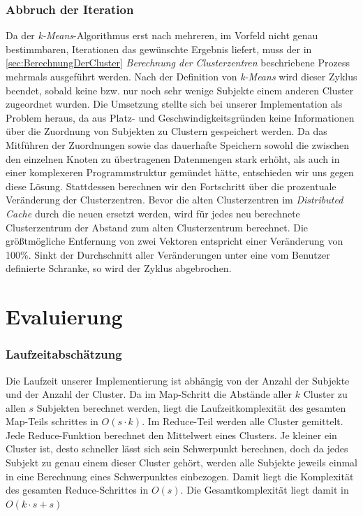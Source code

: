 \documentclass[a4paper]{llncs}
\begin{document}
\subsubsection{Abbruch der Iteration}
Da der \emph{k-Means}-Algorithmus erst nach mehreren, im Vorfeld nicht genau bestimmbaren, Iterationen das gewünschte Ergebnis liefert,
muss der in \ref{sec:BerechnungDerCluster} \emph{Berechnung der Clusterzentren} beschriebene Prozess mehrmals ausgeführt werden.
Nach der Definition von \emph{k-Means} wird dieser Zyklus beendet, sobald keine bzw. nur noch sehr wenige Subjekte einem anderen Cluster zugeordnet wurden.
Die Umsetzung stellte sich bei unserer Implementation als Problem heraus, da aus Platz- und Geschwindigkeitsgründen keine Informationen über die Zuordnung von Subjekten zu Clustern gespeichert werden. 
Da das Mitführen der Zuordnungen sowie das dauerhafte Speichern sowohl die zwischen den einzelnen Knoten zu übertragenen Datenmengen stark erhöht, als auch in einer komplexeren Programmstruktur gemündet hätte, entschieden wir uns gegen diese Lösung. 
Stattdessen berechnen wir den Fortschritt über die prozentuale Veränderung der Clusterzentren. Bevor die alten Clusterzentren im \emph{Distributed Cache} durch die neuen ersetzt werden, wird für jedes neu berechnete Clusterzentrum der Abstand zum alten Clusterzentrum berechnet.
Die größtmögliche Entfernung von zwei Vektoren entspricht einer Veränderung von 100\%. Sinkt der Durchschnitt aller Veränderungen unter eine vom Benutzer definierte Schranke, so wird der Zyklus abgebrochen.

\section{Evaluierung}

\subsubsection{Laufzeitabschätzung}
Die Laufzeit unserer Implementierung ist abhängig von der Anzahl der Subjekte und der Anzahl der Cluster. Da im Map-Schritt die Abstände aller $k$ Cluster zu allen $s$ Subjekten berechnet werden, liegt die Laufzeitkomplexität des gesamten Map-Teils schrittes in $O(s \cdot k)$. 
Im Reduce-Teil werden alle Cluster gemittelt. Jede Reduce-Funktion berechnet den Mittelwert eines Clusters. 
Je kleiner ein Cluster ist, desto schneller lässt sich sein Schwerpunkt berechnen, doch da jedes Subjekt zu genau einem dieser Cluster gehört, werden alle Subjekte jeweils einmal in eine Berechnung eines Schwerpunktes einbezogen. 
Damit liegt die Komplexität des gesamten Reduce-Schrittes in $O(s)$.
Die Gesamtkomplexität liegt damit in $O(k \cdot s + s)$
\end{document}
